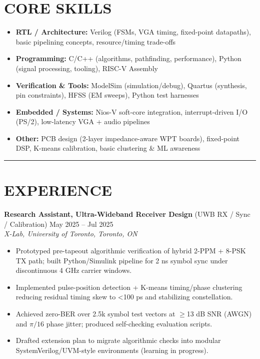 \documentclass[letterpaper,10pt]{article}
\begin{document}
\section*{\textbf{CORE SKILLS}}
\begin{itemize}[leftmargin=0.2in]
    \item \textbf{RTL / Architecture:} Verilog (FSMs, VGA timing, fixed-point datapaths), basic pipelining concepts, resource/timing trade-offs
    \item \textbf{Programming:} C/C++ (algorithms, pathfinding, performance), Python (signal processing, tooling), RISC-V Assembly
    \item \textbf{Verification \& Tools:} ModelSim (simulation/debug), Quartus (synthesis, pin constraints), HFSS (EM sweeps), Python test harnesses
    \item \textbf{Embedded / Systems:} Nios-V soft-core integration, interrupt-driven I/O (PS/2), low-latency VGA + audio pipelines
    \item \textbf{Other:} PCB design (2-layer impedance-aware WPT boards), fixed-point DSP, K-means calibration, basic clustering \& ML awareness
\end{itemize}
\noindent\rule{\linewidth}{1pt}

\section*{\textbf{EXPERIENCE}}
\textbf{Research Assistant, Ultra-Wideband Receiver Design} (UWB RX / Sync / Calibration) \hfill May 2025 -- Jul 2025\\
\textit{X-Lab, University of Toronto, Toronto, ON}
\begin{itemize}[leftmargin=0.2in]
    \item Prototyped pre-tapeout algorithmic verification of hybrid 2-PPM + 8-PSK TX path; built Python/Simulink pipeline for 2 ns symbol sync under discontinuous 4 GHz carrier windows.
    \item Implemented pulse-position detection + K-means timing/phase clustering reducing residual timing skew to <100 ps and stabilizing constellation.
    \item Achieved zero-BER over 2.5k symbol test vectors at $\geq$13 dB SNR (AWGN) and $\pi/16$ phase jitter; produced self-checking evaluation scripts.
    \item Drafted extension plan to migrate algorithmic checks into modular SystemVerilog/UVM-style environments (learning in progress).
\end{itemize}
\end{document}
